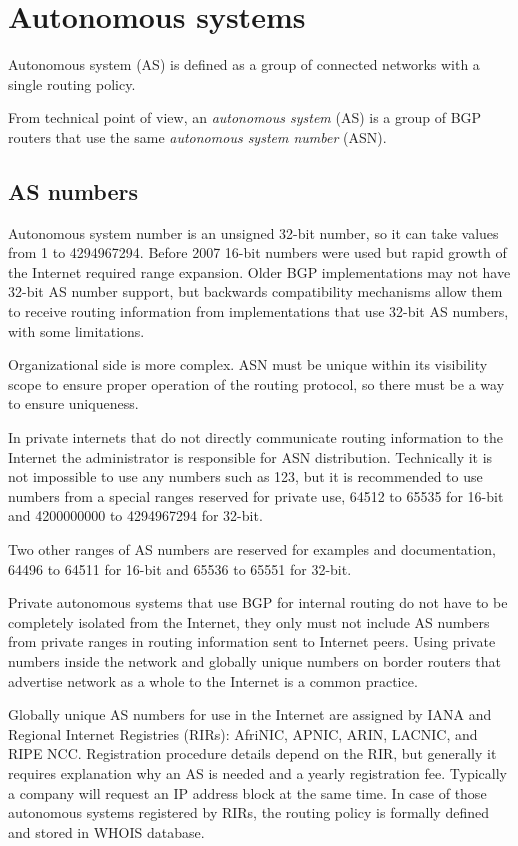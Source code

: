 \chapter{Autonomous systems}

Autonomous system (AS) is defined as a group of connected networks with a single routing policy\cite{rfc1930}.

From technical point of view, an \emph{autonomous system} (AS) is a group of BGP routers that use the same
\emph{autonomous system number} (ASN).

\section{AS numbers}

Autonomous system number is an unsigned 32-bit number, so it can take values from 1 to 4294967294.
Before 2007 16-bit numbers were used but rapid growth of the Internet required range expansion\cite{rfc6793}.
Older BGP implementations may not have 32-bit AS number support, but backwards compatibility mechanisms allow
them to receive routing information from implementations that use 32-bit AS numbers, with some limitations.

Organizational side is more complex. ASN must be unique within its visibility scope to ensure proper
operation of the routing protocol, so there must be a way to ensure uniqueness.

In private internets that do not directly communicate routing information to the Internet the administrator is
responsible for ASN distribution. Technically it is not impossible to use any numbers such as 123,
but it is recommended to use numbers from a special ranges reserved for private use, 64512 to 65535 for
16-bit\cite{rfc1930} and 4200000000 to 4294967294 for 32-bit\cite{rfc6996}.

Two other ranges of AS numbers are reserved for examples and documentation, 64496 to 64511 for 16-bit and
65536 to 65551 for 32-bit\cite{rfc5398}.

Private autonomous systems that use BGP for internal routing do not have to be completely isolated from the Internet,
they only must not include AS numbers from private ranges in routing information sent to Internet peers. Using private
numbers inside the network and globally unique numbers on border routers that advertise network as a whole to the Internet
is a common practice.

Globally unique AS numbers for use in the Internet are assigned by IANA and Regional Internet Registries (RIRs): AfriNIC, APNIC,
ARIN, LACNIC, and RIPE NCC. Registration procedure details depend on the RIR, but generally it requires explanation why
an AS is needed and a yearly registration fee. Typically a company will request an IP address block at the same time.
In case of those autonomous systems registered by RIRs, the routing policy is formally defined and stored in WHOIS database.

